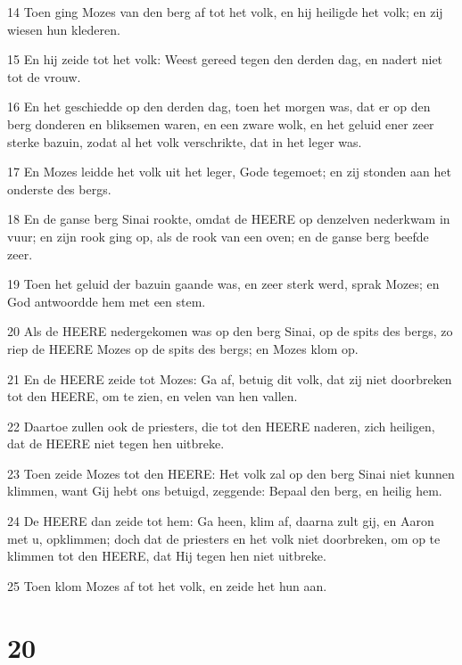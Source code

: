 \par 14 Toen ging Mozes van den berg af tot het volk, en hij heiligde het volk; en zij wiesen hun klederen.
\par 15 En hij zeide tot het volk: Weest gereed tegen den derden dag, en nadert niet tot de vrouw.
\par 16 En het geschiedde op den derden dag, toen het morgen was, dat er op den berg donderen en bliksemen waren, en een zware wolk, en het geluid ener zeer sterke bazuin, zodat al het volk verschrikte, dat in het leger was.
\par 17 En Mozes leidde het volk uit het leger, Gode tegemoet; en zij stonden aan het onderste des bergs.
\par 18 En de ganse berg Sinai rookte, omdat de HEERE op denzelven nederkwam in vuur; en zijn rook ging op, als de rook van een oven; en de ganse berg beefde zeer.
\par 19 Toen het geluid der bazuin gaande was, en zeer sterk werd, sprak Mozes; en God antwoordde hem met een stem.
\par 20 Als de HEERE nedergekomen was op den berg Sinai, op de spits des bergs, zo riep de HEERE Mozes op de spits des bergs; en Mozes klom op.
\par 21 En de HEERE zeide tot Mozes: Ga af, betuig dit volk, dat zij niet doorbreken tot den HEERE, om te zien, en velen van hen vallen.
\par 22 Daartoe zullen ook de priesters, die tot den HEERE naderen, zich heiligen, dat de HEERE niet tegen hen uitbreke.
\par 23 Toen zeide Mozes tot den HEERE: Het volk zal op den berg Sinai niet kunnen klimmen, want Gij hebt ons betuigd, zeggende: Bepaal den berg, en heilig hem.
\par 24 De HEERE dan zeide tot hem: Ga heen, klim af, daarna zult gij, en Aaron met u, opklimmen; doch dat de priesters en het volk niet doorbreken, om op te klimmen tot den HEERE, dat Hij tegen hen niet uitbreke.
\par 25 Toen klom Mozes af tot het volk, en zeide het hun aan.

\chapter{20}

